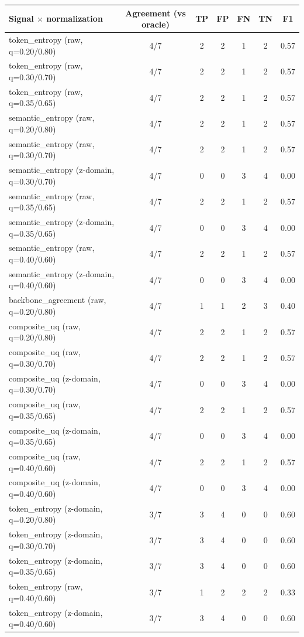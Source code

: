 \begin{tabular}{lcccccc}
\toprule
Signal $\times$ normalization & Agreement (vs oracle) & TP & FP & FN & TN & F1 \\
\midrule
token_entropy (raw, q=0.20/0.80) & 4/7 & 2 & 2 & 1 & 2 & 0.57 \\
token_entropy (raw, q=0.30/0.70) & 4/7 & 2 & 2 & 1 & 2 & 0.57 \\
token_entropy (raw, q=0.35/0.65) & 4/7 & 2 & 2 & 1 & 2 & 0.57 \\
semantic_entropy (raw, q=0.20/0.80) & 4/7 & 2 & 2 & 1 & 2 & 0.57 \\
semantic_entropy (raw, q=0.30/0.70) & 4/7 & 2 & 2 & 1 & 2 & 0.57 \\
semantic_entropy (z-domain, q=0.30/0.70) & 4/7 & 0 & 0 & 3 & 4 & 0.00 \\
semantic_entropy (raw, q=0.35/0.65) & 4/7 & 2 & 2 & 1 & 2 & 0.57 \\
semantic_entropy (z-domain, q=0.35/0.65) & 4/7 & 0 & 0 & 3 & 4 & 0.00 \\
semantic_entropy (raw, q=0.40/0.60) & 4/7 & 2 & 2 & 1 & 2 & 0.57 \\
semantic_entropy (z-domain, q=0.40/0.60) & 4/7 & 0 & 0 & 3 & 4 & 0.00 \\
backbone_agreement (raw, q=0.20/0.80) & 4/7 & 1 & 1 & 2 & 3 & 0.40 \\
composite_uq (raw, q=0.20/0.80) & 4/7 & 2 & 2 & 1 & 2 & 0.57 \\
composite_uq (raw, q=0.30/0.70) & 4/7 & 2 & 2 & 1 & 2 & 0.57 \\
composite_uq (z-domain, q=0.30/0.70) & 4/7 & 0 & 0 & 3 & 4 & 0.00 \\
composite_uq (raw, q=0.35/0.65) & 4/7 & 2 & 2 & 1 & 2 & 0.57 \\
composite_uq (z-domain, q=0.35/0.65) & 4/7 & 0 & 0 & 3 & 4 & 0.00 \\
composite_uq (raw, q=0.40/0.60) & 4/7 & 2 & 2 & 1 & 2 & 0.57 \\
composite_uq (z-domain, q=0.40/0.60) & 4/7 & 0 & 0 & 3 & 4 & 0.00 \\
token_entropy (z-domain, q=0.20/0.80) & 3/7 & 3 & 4 & 0 & 0 & 0.60 \\
token_entropy (z-domain, q=0.30/0.70) & 3/7 & 3 & 4 & 0 & 0 & 0.60 \\
token_entropy (z-domain, q=0.35/0.65) & 3/7 & 3 & 4 & 0 & 0 & 0.60 \\
token_entropy (raw, q=0.40/0.60) & 3/7 & 1 & 2 & 2 & 2 & 0.33 \\
token_entropy (z-domain, q=0.40/0.60) & 3/7 & 3 & 4 & 0 & 0 & 0.60 \\

\end{tabular}

